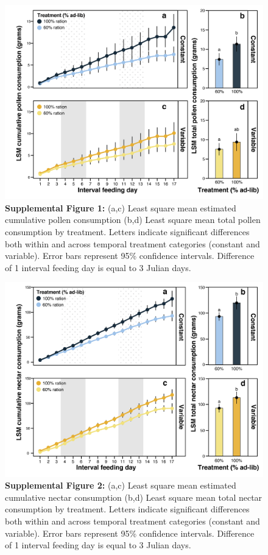 \documentclass[11pt,]{article}
\begin{document}
\clearpage

\newpage

\begin{figure}
\centering
\includegraphics{./supfig1_pollen.png}
\caption{\textbf{Supplemental Figure 1:} (a,c) Least square mean
estimated cumulative pollen consumption (b,d) Least square mean total
pollen consumption by treatment. Letters indicate significant
differences both within and across temporal treatment categories
(constant and variable). Error bars represent 95\% confidence intervals.
Difference of 1 interval feeding day is equal to 3 Julian days.}
\end{figure}

\clearpage

\begin{figure}
\centering
\includegraphics{./supfig2_nectar.png}
\caption{\textbf{Supplemental Figure 2:} (a,c) Least square mean
estimated cumulative nectar consumption (b,d) Least square mean total
nectar consumption by treatment. Letters indicate significant
differences both within and across temporal treatment categories
(constant and variable). Error bars represent 95\% confidence intervals.
Difference of 1 interval feeding day is equal to 3 Julian days.}
\end{figure}
\end{document}
